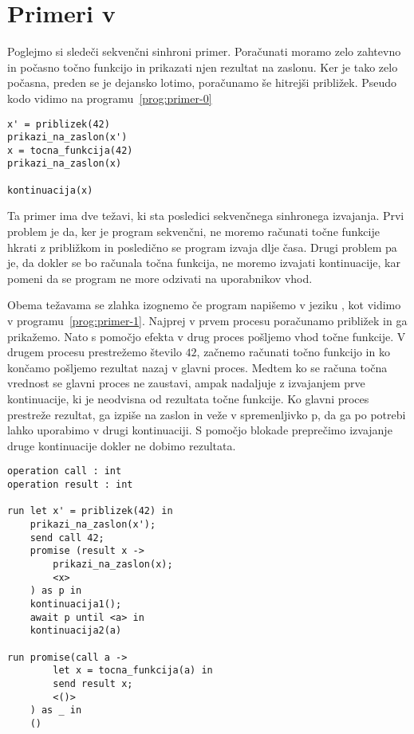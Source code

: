 \section{Primeri v \aeff{}} \label{sec:primeri-aeff}

Poglejmo si sledeči sekvenčni sinhroni primer. Poračunati moramo zelo zahtevno in počasno točno funkcijo in prikazati njen rezultat na zaslonu. Ker je tako zelo počasna, preden se je dejansko lotimo, poračunamo še hitrejši približek. Pseudo kodo vidimo na programu~\ref{prog:primer-0}

\begin{lstlisting}[caption={Sinhron sekvečni primer.},label={prog:primer-0},float,floatplacement=h]
x' = priblizek(42)
prikazi_na_zaslon(x')
x = tocna_funkcija(42)
prikazi_na_zaslon(x)

kontinuacija(x)
\end{lstlisting}

Ta primer ima dve težavi, ki sta posledici sekvenčnega sinhronega izvajanja. Prvi problem je da, ker je program sekvenčni, ne moremo računati točne funkcije hkrati z približkom in posledično se program izvaja dlje časa. Drugi problem pa je, da dokler se bo računala točna funkcija, ne moremo izvajati kontinuacije, kar pomeni da se program ne more odzivati na uporabnikov vhod.  

Obema težavama se zlahka izognemo če program napišemo v jeziku \aeff, kot vidimo v programu~\ref{prog:primer-1}. Najprej v prvem procesu poračunamo približek in ga prikažemo. Nato s pomočjo efekta v drug proces pošljemo vhod točne funkcije. V drugem procesu prestrežemo število $42$, začnemo računati točno funkcijo in ko končamo pošljemo rezultat nazaj v glavni proces. Medtem ko se računa točna vrednost se glavni proces ne zaustavi, ampak nadaljuje z izvajanjem prve kontinuacije, ki je neodvisna od rezultata točne funkcije. Ko glavni proces prestreže rezultat, ga izpiše na zaslon in veže v spremenljivko p, da ga po potrebi lahko uporabimo v drugi kontinuaciji. S pomočjo blokade preprečimo izvajanje druge kontinuacije dokler ne dobimo rezultata.

\begin{lstlisting}[caption={Asinhron Vzporeden primer.},label={prog:primer-1},float,floatplacement=h]
operation call : int
operation result : int
 
run let x' = priblizek(42) in
    prikazi_na_zaslon(x');
    send call 42;
    promise (result x ->
    	prikazi_na_zaslon(x);
    	<x>
    ) as p in
    kontinuacija1();
    await p until <a> in
    kontinuacija2(a)

run promise(call a ->
    	let x = tocna_funkcija(a) in
    	send result x;
    	<()>
    ) as _ in
    ()
\end{lstlisting}
